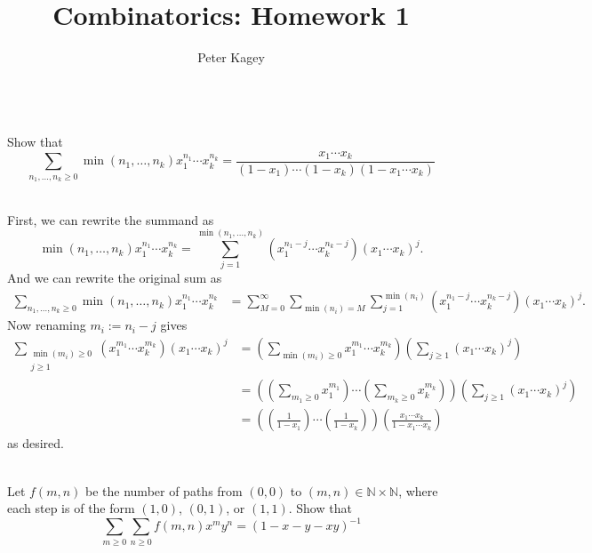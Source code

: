\documentclass{article}
\newenvironment{problem}[2][Problem]{\begin{trivlist}
\item[\hskip \labelsep {\bfseries #1}\hskip \labelsep {\bfseries #2.}]}{\end{trivlist}}
\newenvironment{solution}[1][Solution.]{\begin{trivlist}
\item[\hskip \labelsep {\bfseries #1}]}{\end{trivlist}}
\begin{document}
\title{Combinatorics: Homework 1}
\author{Peter Kagey}

\maketitle

\begin{problem}{5} \text{} \\
  Show that \[
    \sum_{n_1,\hdots,n_k\geq0} \min(n_1,\hdots,n_k)x_1^{n_1}\cdots x_k^{n_k}
    = \frac{x_1\cdots x_k}{(1 - x_1)\cdots(1-x_k)(1 - x_1 \cdots x_k)}
  \]
\end{problem}

\begin{solution} \text{} \\
  First, we can rewrite the summand as \[
  \min(n_1,\hdots,n_k)x_1^{n_1}\cdots x_k^{n_k}
  = \sum_{j = 1}^{\min(n_1,\hdots,n_k)} (x_1^{n_1-j}\cdots x_k^{n_k-j})(x_1 \cdots x_k)^j.
  \] And we can rewrite the original sum as \begin{align*}
    \sum_{n_1,\hdots,n_k\geq0} \min(n_1,\hdots,n_k)x_1^{n_1}\cdots x_k^{n_k}
    &= \sum_{M=0}^\infty\sum_{\min(n_i)=M}\sum_{j = 1}^{\min(n_i)} (x_1^{n_1-j}\cdots x_k^{n_k-j})(x_1 \cdots x_k)^j.
  \end{align*}
  Now renaming $m_i := n_i - j$ gives \begin{align*}
    \sum_{\substack{\min(m_i) \geq 0 \\ j \geq 1}} (x_1^{m_1}\cdots x_k^{m_k})(x_1\cdots x_k)^j
    &=
    \left(\sum_{\min(m_i) \geq 0}x_1^{m_1}\cdots x_k^{m_k}\right)
    \left(\sum_{j \geq 1}(x_1\cdots x_k)^j\right) \\
    &= \left(
      \left(\sum_{m_1 \geq 0}x_1^{m_1}\right)
      \cdots
      \left(\sum_{m_k \geq 0}x_k^{m_k}\right)
    \right)
    \left(\sum_{j \geq 1}(x_1\cdots x_k)^j\right) \\
    &= \left(
      \left(\frac{1}{1 - x_1}\right)
      \cdots
      \left(\frac{1}{1 - x_k}\right)
    \right)
    \left(\frac{x_1\cdots x_k}{1 - x_1\cdots x_k}\right)
  \end{align*}
  as desired.
\end{solution}
\pagebreak
\begin{problem}{9 (a)} \text{} \\
  Let $f(m,n)$ be the number of paths from $(0,0)$ to
  $(m,n) \in \mathbb N \times \mathbb N$, where each step is of the form
  $(1, 0)$, $(0, 1)$, or $(1, 1)$.
  Show that \[
    \sum_{m \geq 0}\sum_{n \geq 0} f(m,n)x^m y^n = (1 - x - y - xy)^{-1}
  \]
\end{problem}
\end{document}
